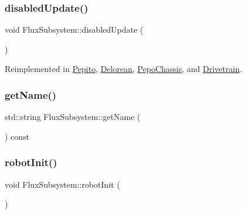 \mbox{\label{classFluxSubsystem_a5c39cb0f0834cc77a2b8f4f47778da87}} 
\subsubsection{\texorpdfstring{disabled\+Update()}{disabledUpdate()}}
{\footnotesize\ttfamily void Flux\+Subsystem\+::disabled\+Update (\begin{DoxyParamCaption}{ }\end{DoxyParamCaption})\hspace{0.3cm}{\ttfamily [virtual]}}



Reimplemented in \hyperlink{classPepito_afc29a2b7ac94a47381ca213dc2993c39}{Pepito}, \hyperlink{classDelorean_acc8f7d93dd894233d16f34316d363983}{Delorean}, \hyperlink{classPepoChassis_a33af04df9c2396d6197f3298172763d9}{Pepo\+Chassis}, and \hyperlink{classDrivetrain_a46aa479a25757868bfda71081ec7baa2}{Drivetrain}.

\mbox{\label{classFluxSubsystem_a661009e388711cd134d519160d1633ac}} 
\subsubsection{\texorpdfstring{get\+Name()}{getName()}}
{\footnotesize\ttfamily std\+::string Flux\+Subsystem\+::get\+Name (\begin{DoxyParamCaption}{ }\end{DoxyParamCaption}) const}

\mbox{\label{classFluxSubsystem_aacd5ddfcadda0866d5e838de09a60d63}} 
\subsubsection{\texorpdfstring{robot\+Init()}{robotInit()}}
{\footnotesize\ttfamily void Flux\+Subsystem\+::robot\+Init (\begin{DoxyParamCaption}{ }\end{DoxyParamCaption})\hspace{0.3cm}{\ttfamily [virtual]}}



